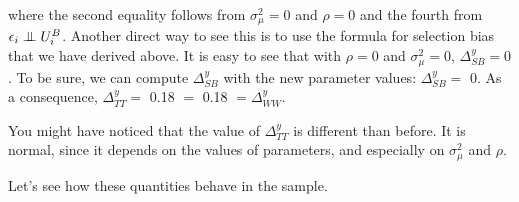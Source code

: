 \documentclass[]{book}
\newcommand\Ind{\protect\mathpalette{\protect\independenT}{\perp}}
\def\independenT#1#2{\mathrel{\setbox0\hbox{$#1#2$}\copy0\kern-\wd0\mkern4mu\box0}}
\theoremstyle{definition}
\theoremstyle{definition}
\theoremstyle{definition}
\theoremstyle{remark}
\let\BeginKnitrBlock\begin \let\EndKnitrBlock\end
\begin{document}
where the second equality follows from \(\sigma^2_{\mu}=0\) and \(\rho=0\) and the fourth from \(\epsilon_i \Ind U_i^B\).
Another direct way to see this is to use the formula for selection bias that we have derived above.
It is easy to see that with \(\rho=0\) and \(\sigma^2_{\mu}=0\), \(\Delta^y_{SB}=0\).
To be sure, we can compute \(\Delta^y_{SB}\) with the new parameter values: \(\Delta^y_{SB}=\) 0.
As a consequence, \(\Delta^y_{TT}=\) 0.18 \(=\) 0.18 \(=\Delta^y_{WW}\).

\BeginKnitrBlock{remark}
\iffalse{} {Remark. } \fi{}You might have noticed that the value of \(\Delta^y_{TT}\) is different than before.
It is normal, since it depends on the values of parameters, and especially on \(\sigma_{\mu}^2\) and \(\rho\).
\EndKnitrBlock{remark}

Let's see how these quantities behave in the sample.
\end{document}
